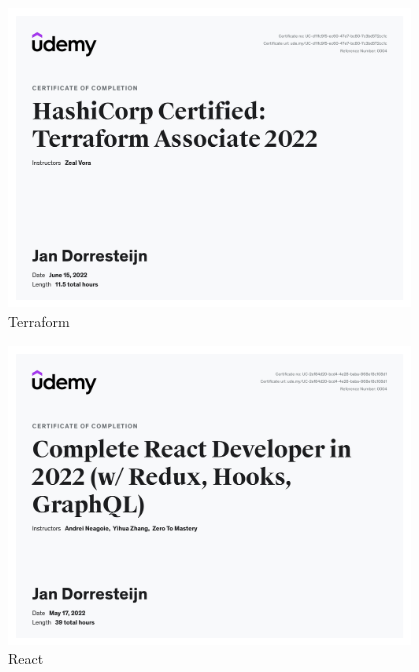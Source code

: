 {{		{
		}
	}
	{%
		\begin{figure}
			\begin{center}
				\includegraphics[width=0.95\textwidth]{images/terra.jpg}
			\end{center}
			\caption{Terraform}
			\label{fig:terraform}
		\end{figure}
		\begin{figure}
			\begin{center}
				\includegraphics[width=0.95\textwidth]{images/react.jpg}
			\end{center}
			\caption{React}
			\label{fig:react}
		\end{figure}
		\begin{figure}
			\begin{center}

\end{center}
\end{figure}}}
